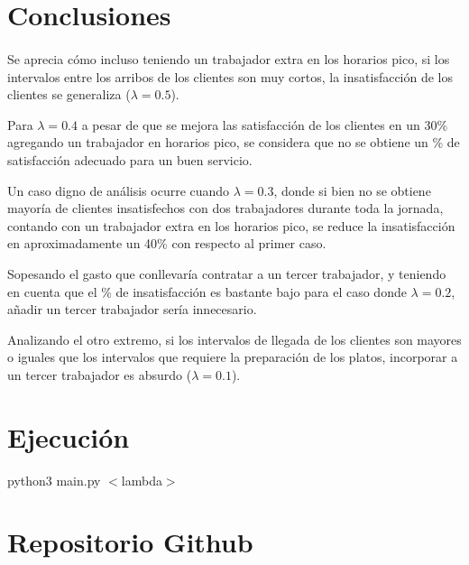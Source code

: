 \documentclass{article}
\begin{document}
\section {Conclusiones}
\paragraph{}
Se aprecia cómo incluso teniendo un trabajador extra en los horarios pico, si los intervalos entre los arribos de 
los clientes son muy cortos, la insatisfacción de los clientes se generaliza ($\lambda = 0.5$).

Para $\lambda = 0.4$ a pesar de que se mejora las satisfacción de los clientes en un 30\% agregando un trabajador en
horarios pico, se considera que no se obtiene un \% de satisfacción adecuado para un buen servicio.

Un caso digno de análisis ocurre cuando $\lambda = 0.3$, donde si bien no se obtiene mayoría
de clientes insatisfechos con dos trabajadores durante toda la jornada, contando con un trabajador extra en los
horarios pico, se reduce la insatisfacción en aproximadamente un 40\% con respecto al primer caso.

Sopesando el gasto que conllevaría contratar a un tercer trabajador, y teniendo en cuenta que el \%
de  insatisfacción es bastante bajo para el caso donde $\lambda = 0.2$, añadir un tercer trabajador sería
innecesario.

Analizando el otro extremo, si los 
intervalos de llegada de los clientes son mayores o iguales que los intervalos que requiere la preparación de los 
platos, incorporar a un tercer trabajador es absurdo ($\lambda = 0.1$).

\section {Ejecución}
python3 main.py $<$lambda$>$

\section {Repositorio Github}
\end{document}
